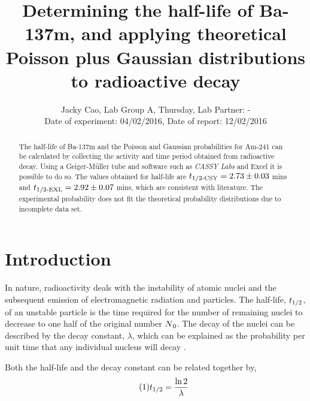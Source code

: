 \documentclass[twocolumn]{revtex4}
\begin{document}
\textheight=24.75cm

\title{Determining the half-life of Ba-137m, and applying theoretical Poisson plus Gaussian distributions to radioactive decay} 
 
 
\author{Jacky Cao, Lab Group A, Thursday, Lab Partner: - \\ Date of experiment: 04/02/2016, Date of report: 12/02/2016}


\begin{abstract}              
 
The half-life of Ba-137m and the Poisson and Gaussian probabilities for Am-241 can be calculated by collecting the activity and time period obtained from radioactive decay. Using a Geiger-M\"{u}ller tube and software such as \textit{CASSY Labs} and Excel it is possible to do so. The values obtained for half-life are $t\textsubscript{1/2-CSY}=2.73\pm0.03$ mins and $t\textsubscript{1/2-EXL}=2.92\pm0.07$ mins, which are consistent with literature. The experimental probability does not fit the theoretical probability distributions due to incomplete data set.

\end{abstract}

\maketitle

\section{Introduction} 
\vspace{-2ex} 


In nature, radioactivity deals with the instability of atomic nuclei and the subsequent emission of electromagnetic radiation and particles. The half-life, $t\textsubscript{1/2}$, of an unstable particle is the time required for the number of remaining nuclei to decrease to one half of the original number $N\textsubscript{0}$. The decay of the nuclei can be described by the decay constant, $\lambda $, which can be explained as the probability per unit time that any individual nucleus will decay \cite{decay}.

Both the half-life and the decay constant can be related together by,
\begin{equation} \tag{1}
t\textsubscript{1/2} = \frac{\ln2}{\lambda}\\
\end{equation}
\end{document}
